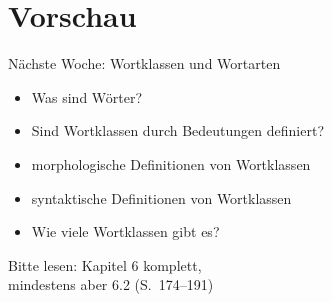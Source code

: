 \section{Vorschau}

\begin{frame}
  {Nächste Woche: Wortklassen und Wortarten}
  \pause
  \begin{itemize}[<+->]
    \item Was sind Wörter?
    \item Sind Wortklassen durch \alert{Bedeutungen} definiert?
    \item \alert{morphologische} Definitionen von Wortklassen
    \item \alert{syntaktische} Definitionen von Wortklassen
    \item \alert{Wie viele Wortklassen gibt es?}
  \end{itemize}
  \pause
  \Zeile
  \centering
  \Large
  \alert{Bitte lesen: Kapitel 6 komplett,\\
  mindestens aber 6.2 (S.~174--191)}
  \pause
  \pause
  \pause
  \pause
  \pause
\end{frame}

